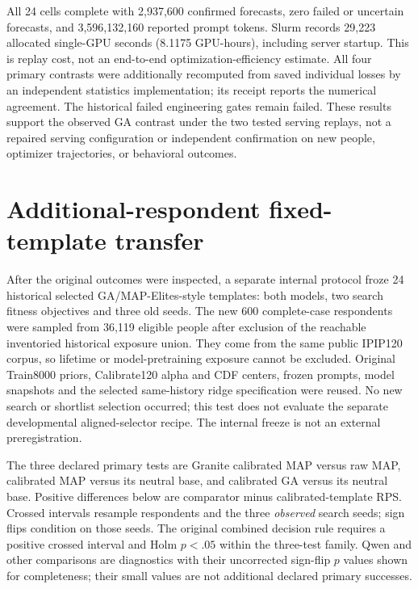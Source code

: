 \documentclass[10pt,twocolumn]{article}
\begin{document}
All 24 cells complete with 2,937,600 confirmed forecasts, zero failed or
uncertain forecasts, and 3,596,132,160 reported prompt tokens. Slurm records
29,223 allocated single-GPU seconds (8.1175 GPU-hours), including server startup.
This is replay cost, not an end-to-end optimization-efficiency estimate.
All four primary contrasts were additionally recomputed from saved individual
losses by an independent statistics implementation; its receipt reports the
numerical agreement. The historical failed engineering gates remain failed.
These results support the observed GA contrast under the two tested serving
replays, not a repaired serving configuration or independent confirmation on
new people, optimizer trajectories, or behavioral outcomes.

\section{Additional-respondent fixed-template transfer}\label{sec:transfer}
After the original outcomes were inspected, a separate internal protocol
froze 24 historical selected GA/MAP-Elites-style templates: both models, two
search fitness objectives and three old seeds. The new 600 complete-case
respondents were sampled from 36,119 eligible people after exclusion of the
reachable inventoried historical exposure union. They come from the same
public IPIP120 corpus, so lifetime or model-pretraining exposure cannot be
excluded. Original Train8000 priors, Calibrate120 alpha and CDF centers,
frozen prompts, model snapshots and the selected same-history ridge
specification were reused. No new search or shortlist selection occurred;
this test does not evaluate the separate developmental aligned-selector
recipe. The internal freeze is not an external preregistration.

The three declared primary tests are Granite calibrated MAP versus raw MAP,
calibrated MAP versus its neutral base, and calibrated GA versus its neutral
base. Positive differences below are comparator minus calibrated-template
RPS. Crossed intervals resample respondents and the three \emph{observed}
search seeds; sign flips condition on those seeds. The original combined
decision rule requires a positive crossed interval and Holm $p<.05$ within
the three-test family. Qwen and other comparisons are diagnostics with their
uncorrected sign-flip $p$ values shown for completeness; their small values
are not additional declared primary successes.
\end{document}
